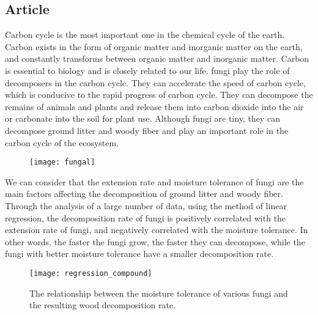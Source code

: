 \documentclass{mcmthesis}
\begin{document}
\begin{appendices}

\section{Article}







Carbon cycle is the most important one in the chemical cycle of the earth. Carbon exists in the form of organic matter and inorganic matter on the earth, and constantly transforms between organic matter and inorganic matter. Carbon is essential to biology and is closely related to our life. fungi play the role of decomposers in the carbon cycle. They can accelerate the speed of carbon cycle, which is conducive to the rapid progress of carbon cycle. They can decompose the remains of animals and plants and release them into carbon dioxide into the air or carbonate into the soil for plant use. Although fungi are tiny, they can decompose ground litter and woody fiber and play an important role in the carbon cycle of the ecosystem.

\begin{figure}[H]
  \small
  \centering
  \texttt{[image: fungal]}
  \label{fungal}
\end{figure}

We can consider that the extension rate and moisture tolerance of fungi are the main factors affecting the decomposition of ground litter and woody fiber. Through the analysis of a large number of data, using the method of linear regression, the decomposition rate of fungi is positively correlated with the extension rate of fungi, and negatively correlated with the moisture tolerance. In other words, the faster the fungi grow, the faster they can decompose, while the fungi with better moisture tolerance have a smaller decomposition rate.

\begin{figure}[H]
  \small
  \centering
  \texttt{[image: regression\_compound]}
  \caption{The relationship between the moisture tolerance of various fungi and the resulting wood decomposition rate.}
  \label{regression_compound}
\end{figure}


\end{appendices}
\end{document}
